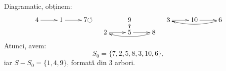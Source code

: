 Diagramatic, obținem:
\[
  \xymatrixrowsep{0.5pc}
  \xymatrix{
    4 \ar[r] & 1 \ar[r] & 7{\circlearrowleft}
  }
  \quad
  \xymatrix{
    & 9 \ar[d] & \\
    2 \ar[r] & 5 \ar[r] & 8 \ar@/^/[ll]
  }
  \quad
  \xymatrix{
    3 \ar[r] & 10 \ar[r] & 6 \ar@/^/[ll]
  }
\]
Atunci, avem:
\[
  S_0 = \{ 7, 2, 5, 8, 3, 10, 6 \},
\]
iar $ S - S_0 = \{ 1, 4, 9 \} $, formată din 3 arbori.




